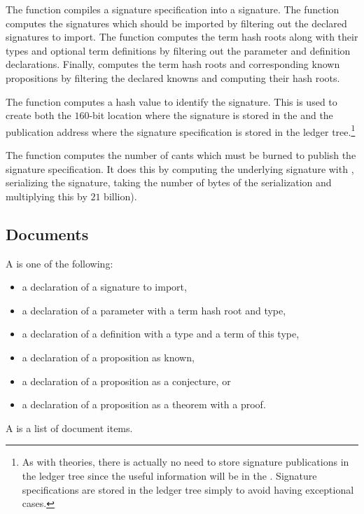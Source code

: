 The function
{}
compiles a signature specification into a signature.
The function {} computes the signatures which should be imported
by filtering out the declared signatures to import.
The function {} computes the term hash roots along with their types
and optional term definitions by filtering out the parameter and definition
declarations.
Finally, {} computes the term hash roots and corresponding known
propositions by filtering the declared knowns and computing their hash roots.

The function {} computes a hash value to identify the signature.
This is used to create both the $160$-bit location where the signature is stored
in the {}
and the publication address where the signature specification is stored in the ledger tree.\footnote{As with theories, there is actually no need to store signature publications in the ledger tree since the useful information will be in the {}. Signature specifications are stored in the ledger tree simply to
avoid having exceptional cases.}

The function {} computes the number of cants which must
be burned
to publish the signature specification. It does this by computing the underlying signature with {},
serializing the signature, taking the number of bytes of the serialization and multiplying this by
$21$ billion).


\subsection{Documents}

A {} is one of the following:
\begin{itemize}
\item a declaration of a signature to import,
\item a declaration of a parameter with a term hash root and type,
\item a declaration of a definition with a type and a term of this type,
\item a declaration of a proposition as known,
\item a declaration of a proposition as a conjecture, or
\item a declaration of a proposition as a theorem with a proof.
\end{itemize}
A {} is a list of document items.

